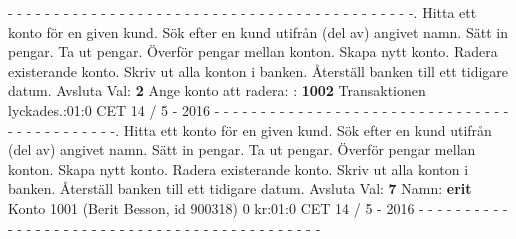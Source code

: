 \newline
- - - - - - - - - - - - - - - - - - - - - - - - - - - - - - - - - - - - - - - - - - - -.   Hitta ett konto för en given kund.   Sök efter en kund utifrån (del av) angivet namn.   Sätt in pengar.   Ta ut pengar.   Överför pengar mellan konton.   Skapa nytt konto.   Radera existerande konto.   Skriv ut alla konton i banken.   Återställ banken till ett tidigare datum. Avsluta\newline
Val: \textbf{2}\newline
Ange konto att radera: : \textbf{1002}\newline
Transaktionen lyckades.:01:0 CET 14 / 5 - 2016\newline
- - - - - - - - - - - - - - - - - - - - - - - - - - - - - - - - - - - - - - - - - - - -.   Hitta ett konto för en given kund.   Sök efter en kund utifrån (del av) angivet namn.   Sätt in pengar.   Ta ut pengar.   Överför pengar mellan konton.   Skapa nytt konto.   Radera existerande konto.   Skriv ut alla konton i banken.   Återställ banken till ett tidigare datum. Avsluta\newline
Val: \textbf{7}\newline
Namn: \textbf{erit}\newline
Konto 1001 (Berit Besson, id 900318) 0 kr:01:0 CET 14 / 5 - 2016\newline
- - - - - - - - - - - - - - - - - - - - - - - - - - - - - - - - - - - - - - - - - - - -\newline
